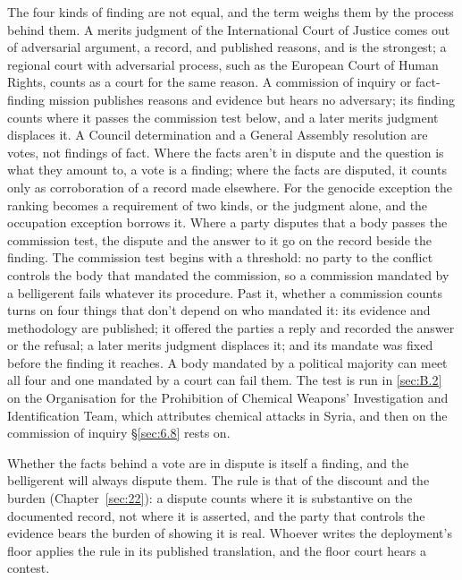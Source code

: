 The four kinds of finding are not equal, and the term weighs them by the process behind them. A merits judgment of the International Court of Justice comes out of adversarial argument, a record, and published reasons, and is the strongest; a regional court with adversarial process, such as the European Court of Human Rights, counts as a court for the same reason. A commission of inquiry or fact-finding mission publishes reasons and evidence but hears no adversary; its finding counts where it passes the commission test below, and a later merits judgment displaces it. A Council determination and a General Assembly resolution are votes, not findings of fact. Where the facts aren't in dispute and the question is what they amount to, a vote is a finding; where the facts are disputed, it counts only as corroboration of a record made elsewhere. For the genocide exception the ranking becomes a requirement of two kinds, or the judgment alone, and the occupation exception borrows it. Where a party disputes that a body passes the commission test, the dispute and the answer to it go on the record beside the finding. The commission test begins with a threshold: no party to the conflict controls the body that mandated the commission, so a commission mandated by a belligerent fails whatever its procedure. Past it, whether a commission counts turns on four things that don't depend on who mandated it: its evidence and methodology are published; it offered the parties a reply and recorded the answer or the refusal; a later merits judgment displaces it; and its mandate was fixed before the finding it reaches. A body mandated by a political majority can meet all four and one mandated by a court can fail them. The test is run in \ref{sec:B.2} on the Organisation for the Prohibition of Chemical Weapons' Investigation and Identification Team, which attributes chemical attacks in Syria, and then on the commission of inquiry \S\ref{sec:6.8} rests on.

Whether the facts behind a vote are in dispute is itself a finding, and the belligerent will always dispute them. The rule is that of the discount and the burden (Chapter~\ref{sec:22}): a dispute counts where it is substantive on the documented record, not where it is asserted, and the party that controls the evidence bears the burden of showing it is real. Whoever writes the deployment's floor applies the rule in its published translation, and the floor court hears a contest.
